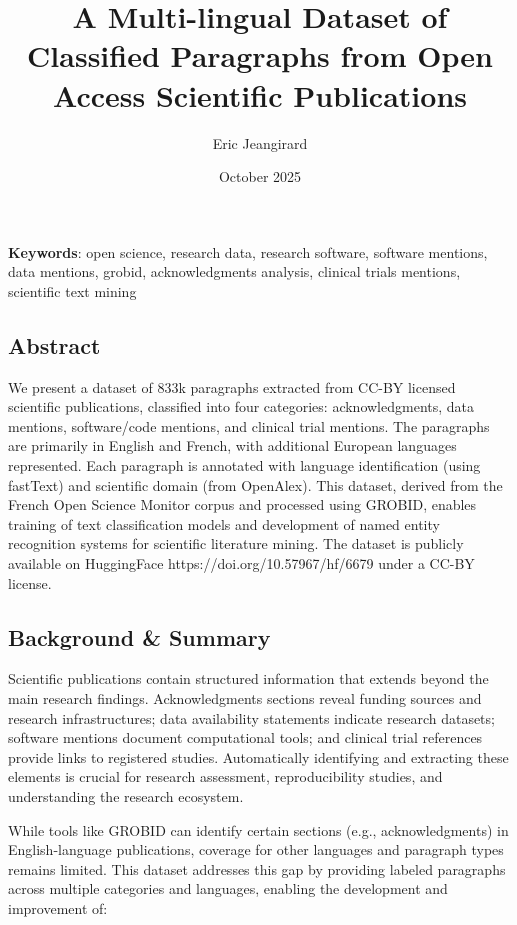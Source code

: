 \documentclass[
]{article}
\title{A Multi-lingual Dataset of Classified Paragraphs from Open Access
Scientific Publications}
\author[%
  1%
  ]{%
  Eric Jeangirard%
}
\affil[1]{French Ministry of Higher Education and Research, Paris,
France}
\date{October 2025}
\begin{document}
\maketitle

\textbf{Keywords}: open science, research data, research software,
software mentions, data mentions, grobid, acknowledgments analysis,
clinical trials mentions, scientific text mining

\hypertarget{abstract}{%
\subsection{Abstract}\label{abstract}}

We present a dataset of 833k paragraphs extracted from CC-BY licensed
scientific publications, classified into four categories:
acknowledgments, data mentions, software/code mentions, and clinical
trial mentions. The paragraphs are primarily in English and French, with
additional European languages represented. Each paragraph is annotated
with language identification (using fastText) and scientific domain
(from OpenAlex). This dataset, derived from the French Open Science
Monitor corpus and processed using GROBID, enables training of text
classification models and development of named entity recognition
systems for scientific literature mining. The dataset is publicly
available on HuggingFace https://doi.org/10.57967/hf/6679 under a CC-BY
license.

\hypertarget{background-summary}{%
\subsection{Background \& Summary}\label{background-summary}}

Scientific publications contain structured information that extends
beyond the main research findings. Acknowledgments sections reveal
funding sources and research infrastructures; data availability
statements indicate research datasets; software mentions document
computational tools; and clinical trial references provide links to
registered studies. Automatically identifying and extracting these
elements is crucial for research assessment, reproducibility studies,
and understanding the research ecosystem.

While tools like GROBID can identify certain sections (e.g.,
acknowledgments) in English-language publications, coverage for other
languages and paragraph types remains limited. This dataset addresses
this gap by providing labeled paragraphs across multiple categories and
languages, enabling the development and improvement of:
\end{document}
